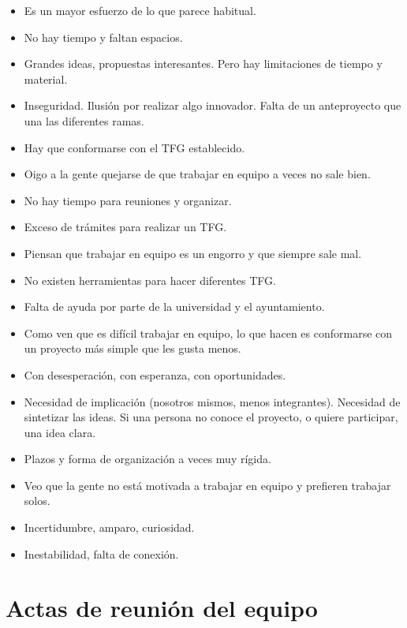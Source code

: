 \begin{itemize}
\begin{itemize}
        \item Es un mayor esfuerzo de lo que parece habitual.
        \item No hay tiempo y faltan espacios.
        \item Grandes ideas, propuestas interesantes. Pero hay limitaciones de tiempo y material.
        \item Inseguridad. Ilusión por realizar algo innovador. Falta de un anteproyecto que una las diferentes ramas.
        \item Hay que conformarse con el TFG establecido.
        \item Oigo a la gente quejarse de que trabajar en equipo a veces no sale bien.
        \item No hay tiempo para reuniones y organizar.
        \item Exceso de trámites para realizar un TFG.
        \item Piensan que trabajar en equipo es un engorro y que siempre sale mal.
        \item No existen herramientas para hacer diferentes TFG.
        \item Falta de ayuda por parte de la universidad y el ayuntamiento.
        \item Como ven que es difícil trabajar en equipo, lo que hacen es conformarse con un proyecto más simple que les gusta menos.
        \item Con desesperación, con esperanza, con oportunidades.
        \item Necesidad de implicación (nosotros mismos, menos integrantes). Necesidad de sintetizar las ideas. Si una persona no conoce el proyecto, o quiere participar, una idea clara.
        \item Plazos y forma de organización a veces muy rígida.
        \item Veo que la gente no está motivada a trabajar en equipo y prefieren trabajar solos.
        \item Incertidumbre, amparo, curiosidad.
        \item Inestabilidad, falta de conexión.
    \end{itemize}
\end{itemize}

\section{Actas de reunión del equipo}
\label{sec:actas}










